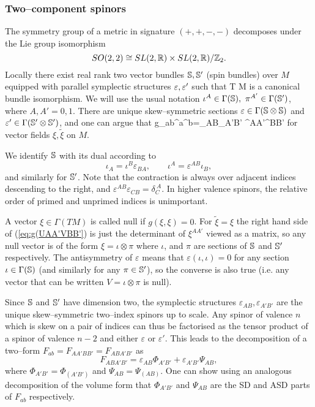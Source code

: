 \subsubsection{Two--component spinors}
The symmetry group of a metric in signature $(+,+,-,-)$ decomposes under the Lie group isomorphism
\[
SO(2,2)\cong SL(2,\mathbb{R}) \times SL(2,\mathbb{R})/\mathbb{Z}_2.
\]
Locally there exist real rank two vector bundles $\mathbb{S}, \mathbb{S}'$  (spin bundles) over $M$ equipped with parallel symplectic structures
${\varepsilon}, {\varepsilon}'$ such that \cite{penroserindler}
\be
\label{can_bun_iso}
T M\cong {\spp}
\ee
is a  canonical bundle isomorphism. We will use the usual notation $\iota^A\in\Gamma(\spp),\ \pi^{A'}\in\Gamma(\spp')$, where $A,A'=0,1$. There are unique skew--symmetric sections $\varepsilon\in\Gamma(\mathbb{S}\otimes\mathbb{S})$ and $\varepsilon'\in\Gamma(\mathbb{S}'\otimes\mathbb{S}')$, and one can argue that
\be \label{eq:g(UAA'VBB'}
g_{ab}\xi^a\tilde{\xi}^b=\varepsilon_{AB}\varepsilon_{A'B'} \xi^{AA'}\tilde{\xi}^{BB'}
\ee
for vector fields $\xi,\tilde{\xi}$ on $M$.

We identify $\mathbb{S}$ with its dual according to
\[
\iota_A=\iota^B\varepsilon_{BA},\qquad \iota^A=\varepsilon^{AB}\iota_B,
\]
and similarly for $\mathbb{S}'$. Note that the contraction is always over adjacent indices descending to the right, and $\varepsilon^{AB}\varepsilon_{CB}=\delta_C^{\ A}$. In higher valence spinors, the relative order of primed and unprimed indices is unimportant.

A vector $\xi\in \Gamma(TM)$ is called null if $g(\xi, \xi)=0$. For $\tilde{\xi}=\xi$ the right hand side of (\ref{eq:g(UAA'VBB'}) is just the determinant of $\xi^{AA'} $ viewed as a matrix, so any null vector is of the form
$\xi=\iota \otimes \pi$ where $\iota$, and $\pi$ are sections of
$\mathbb{S}$ and $\mathbb{S}'$ respectively. The antisymmetry of $\varepsilon$ means that $\varepsilon(\iota,\iota)=0$ for any section $\iota\in\Gamma(\mathbb{S})$ (and similarly for any $\pi\in\mathbb{S}'$), so the converse is also true (i.e. any vector that can be written $V=\iota\otimes \pi$ is null).

Since $\mathbb{S}$ and $\mathbb{S}'$ have dimension two, the symplectic structures $\varepsilon_{AB},\varepsilon_{A'B'}$ are the unique skew--symmetric two--index spinors up to scale. Any spinor of valence $n$ which is skew on a pair of indices can thus be factorised as the tensor product of a spinor of valence $n-2$ and either $\varepsilon$ or $\varepsilon'$. This leads to the decomposition of a two--form $F_{ab}=F_{AA'BB'}=F_{ABA'B'}$ as
\[
F_{ABA'B'} = \varepsilon_{AB}\Phi_{A'B'} + \varepsilon_{A'B'}\Psi_{AB},
\]
where $\Phi_{A'B'}=\Phi_{(A'B')}$ and $\Psi_{AB}=\Psi_{(AB)}$. One can show using an analogous decomposition of the volume form that $\Phi_{A'B'}$ and $\Psi_{AB}$ are the SD and ASD parts of $F_{ab}$ respectively.

